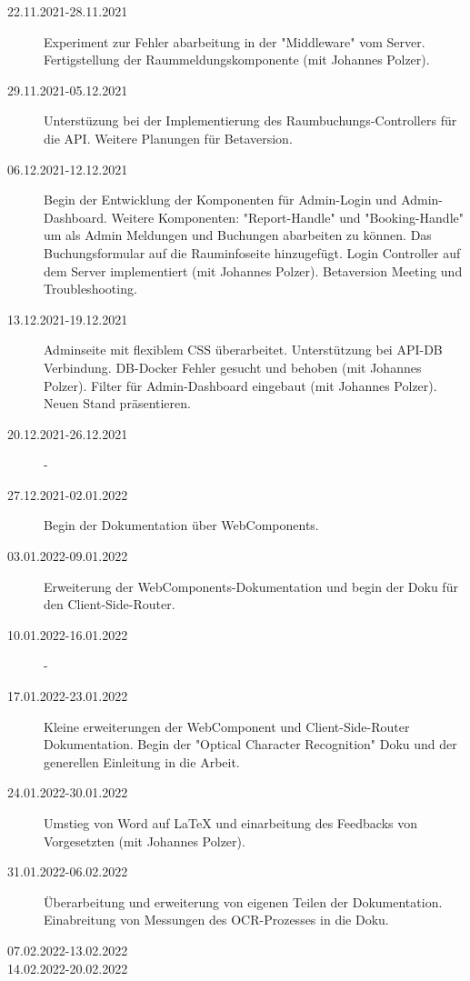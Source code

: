\begin{description}
    \item[22.11.2021-28.11.2021] Experiment zur Fehler abarbeitung in der "Middleware" vom Server. Fertigstellung der Raummeldungskomponente (mit Johannes Polzer).
    \item[29.11.2021-05.12.2021] Unterstüzung bei der Implementierung des Raumbuchungs-Controllers für die API. Weitere Planungen für Betaversion.
    \item[06.12.2021-12.12.2021] Begin der Entwicklung der Komponenten für Admin-Login und Admin-Dashboard. Weitere Komponenten: "Report-Handle" und "Booking-Handle" um als Admin Meldungen und Buchungen abarbeiten zu können. Das Buchungsformular auf die Rauminfoseite hinzugefügt. Login Controller auf dem Server implementiert (mit Johannes Polzer). Betaversion Meeting und Troubleshooting.
    \item[13.12.2021-19.12.2021] Adminseite mit flexiblem CSS überarbeitet. Unterstützung bei API-DB Verbindung. DB-Docker Fehler gesucht und behoben (mit Johannes Polzer). Filter für Admin-Dashboard eingebaut (mit Johannes Polzer). Neuen Stand präsentieren.
    \item[20.12.2021-26.12.2021] - 
    \item[27.12.2021-02.01.2022] Begin der Dokumentation über WebComponents.
    \item[03.01.2022-09.01.2022] Erweiterung der WebComponents-Dokumentation und begin der Doku für den Client-Side-Router.
    \item[10.01.2022-16.01.2022] - 
    \item[17.01.2022-23.01.2022] Kleine erweiterungen der WebComponent und Client-Side-Router Dokumentation. Begin der "Optical Character Recognition" Doku und der generellen Einleitung in die Arbeit. 
    \item[24.01.2022-30.01.2022] Umstieg von Word auf LaTeX und einarbeitung des Feedbacks von Vorgesetzten (mit Johannes Polzer). 
    \item[31.01.2022-06.02.2022] Überarbeitung und erweiterung von eigenen Teilen der Dokumentation. Einabreitung von Messungen des OCR-Prozesses in die Doku.
    \item[07.02.2022-13.02.2022]
    \item[14.02.2022-20.02.2022] 
\end{description}